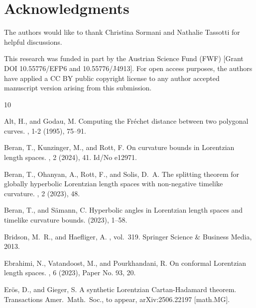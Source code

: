 \documentclass[a4paper,11pt]{article}
\numberwithin{equation}{section}
\theoremstyle{plain}
\theoremstyle{definition}
\begin{document}
\section*{Acknowledgments}

The authors would like to thank Christina Sormani and Nathalie Tassotti for helpful discussions.

This research was funded in part by the Austrian Science Fund (FWF) [Grant DOI 10.55776/EFP6 and 10.55776/J4913]. For open access purposes, the authors have applied a CC BY public copyright license to any author accepted manuscript version arising from this submission.

% 
%
%

\begin{thebibliography}{10}

{\sc Alt, H., and Godau, M.}
\newblock Computing the {Fr{\'e}chet} distance between two polygonal curves.
, 1-2 (1995), 75--91.

{\sc Beran, T., Kunzinger, M., and Rott, F.}
\newblock On curvature bounds in {Lorentzian} length spaces.
, 2 (2024), 41.
\newblock Id/No e12971.

{\sc Beran, T., Ohanyan, A., Rott, F., and Solis, D.~A.}
\newblock The splitting theorem for globally hyperbolic {Lorentzian} length
 spaces with non-negative timelike curvature.
, 2 (2023), 48.

{\sc Beran, T., and S{\"a}mann, C.}
\newblock Hyperbolic angles in {L}orentzian length spaces and timelike
 curvature bounds.
 (2023), 1--58.

{\sc Bridson, M.~R., and Haefliger, A.}
, vol.~319.
\newblock Springer Science \& Business Media, 2013.

{\sc Ebrahimi, N., Vatandoost, M., and Pourkhandani, R.}
\newblock On conformal {L}orentzian length spaces.
, 6 (2023), Paper No. 93, 20.

{\sc Er{\"o}s, D., and Gieger, S.}
\newblock A synthetic {Lorentzian} {Cartan}-{Hadamard} theorem.
\newblock Transactions Amer.\ Math.\ Soc., to appear, {arXiv}:2506.22197 [math.{MG}].


\end{thebibliography}
\end{document}
